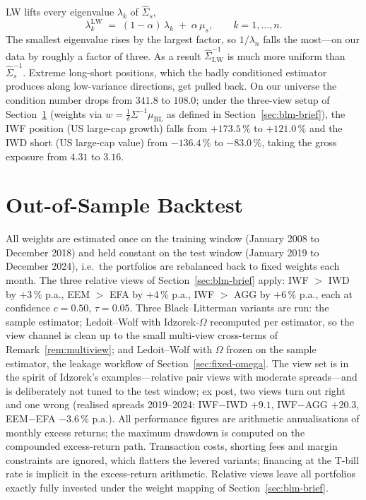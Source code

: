 \documentclass[a4paper,11pt]{article}
\theoremstyle{plain}
\theoremstyle{definition}
\newcommand{\muBL}{\mu_{\mathrm{BL}}}
\newcommand{\LW}{\mathrm{LW}}
\begin{document}
LW lifts every eigenvalue $\lambda_k$ of $\hat\Sigma_s$,
\[
    \lambda_k^{\LW} \;=\; (1-\alpha)\,\lambda_k \;+\; \alpha\,\mu_s,
    \qquad k = 1,\dots,n.
\]
The smallest eigenvalue rises by the largest factor, so $1/\lambda_n$
falls the most---on our data by roughly a factor of three. As a result
$\hat\Sigma_{\LW}^{-1}$ is much more uniform than $\hat\Sigma_s^{-1}$.
Extreme long-short positions, which the badly conditioned estimator
produces along low-variance directions, get pulled back. On our universe
the condition number drops from $341.8$ to $108.0$; under the three-view
setup of Section~\ref{sec:backtest} (weights via
$w = \tfrac{1}{\delta}\Sigma^{-1}\muBL$ as defined in
Section~\ref{sec:blm-brief}), the IWF position (US large-cap growth)
falls from $+173.5\,\%$ to $+121.0\,\%$ and the IWD short (US large-cap
value) from $-136.4\,\%$ to $-83.0\,\%$, taking the gross exposure from
$4.31$ to $3.16$.

\section{Out-of-Sample Backtest}
\label{sec:backtest}

All weights are estimated once on the training window (January 2008 to
December 2018) and held constant on the test window (January 2019 to
December 2024), i.e.\ the portfolios are rebalanced back to fixed
weights each month. The three relative views of
Section~\ref{sec:blm-brief} apply: IWF $>$ IWD by $+3\,\%$ p.a., EEM $>$
EFA by $+4\,\%$ p.a., IWF $>$ AGG by $+6\,\%$ p.a., each at confidence
$c = 0.50$, $\tau = 0.05$. Three Black--Litterman variants are run: the
sample estimator; Ledoit--Wolf with Idzorek-$\Omega$ recomputed per
estimator, so the view channel is clean up to the small multi-view
cross-terms of Remark~\ref{rem:multiview}; and Ledoit--Wolf with
$\Omega$ frozen on the sample estimator, the leakage workflow of
Section~\ref{sec:fixed-omega}. The view set is in the spirit of
Idzorek's examples---relative pair views with moderate spreads---and is
deliberately not tuned to the test window; ex post, two views turn out
right and one wrong (realised spreads 2019--2024: IWF$-$IWD $+9.1$,
IWF$-$AGG $+20.3$, EEM$-$EFA $-3.6\,\%$ p.a.). All performance figures
are arithmetic annualisations of monthly excess returns; the maximum
drawdown is computed on the compounded excess-return path. Transaction
costs, shorting fees and margin constraints are ignored, which flatters
the levered variants; financing at the T-bill rate is implicit in the
excess-return arithmetic. Relative views leave all portfolios exactly
fully invested under the weight mapping of Section~\ref{sec:blm-brief}.
\end{document}
